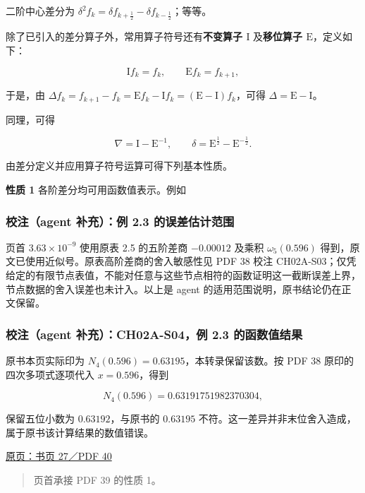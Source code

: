 \documentclass[
  10pt,
  fontset=fandol]{ctexart}
\begin{document}
二阶中心差分为 \(\delta^2 f_k=\delta f_{k+\frac12}-\delta f_{k-\frac12}\)；等等。

除了已引入的差分算子外，常用算子符号还有\textbf{不变算子 \(\mathrm{I}\)} 及\textbf{移位算子 \(\mathrm{E}\)}，定义如下：

\[
\mathrm{I}f_k=f_k,\qquad\mathrm{E}f_k=f_{k+1},
\]

于是，由 \(\Delta f_k=f_{k+1}-f_k=\mathrm{E}f_k-\mathrm{I}f_k=(\mathrm{E}-\mathrm{I})f_k\)，可得 \(\Delta=\mathrm{E}-\mathrm{I}\)。

同理，可得

\[
\nabla=\mathrm{I}-\mathrm{E}^{-1},\qquad
\delta=\mathrm{E}^{\frac12}-\mathrm{E}^{-\frac12}.
\]

由差分定义并应用算子符号运算可得下列基本性质。

\textbf{性质 1} 各阶差分均可用函数值表示。例如

\subsubsection{校注（agent 补充）：例 2.3 的误差估计范围}\label{ux6821ux6ce8agent-ux8865ux5145ux4f8b-2.3-ux7684ux8befux5deeux4f30ux8ba1ux8303ux56f4}

页首 \(3.63\times10^{-9}\) 使用原表 2.5 的五阶差商 \(-0.00012\) 及乘积 \(\omega_5(0.596)\) 得到，原文已使用近似号。原表高阶差商的舍入敏感性见 PDF 38 校注 CH02A-S03；仅凭给定的有限节点表值，不能对任意与这些节点相符的函数证明这一截断误差上界，节点数据的舍入误差也未计入。以上是 agent 的适用范围说明，原书结论仍在正文保留。

\subsubsection{校注（agent 补充）：CH02A-S04，例 2.3 的函数值结果}\label{ux6821ux6ce8agent-ux8865ux5145ch02a-s04ux4f8b-2.3-ux7684ux51fdux6570ux503cux7ed3ux679c}

原书本页实际印为 \(N_4(0.596)=0.63195\)，本转录保留该数。按 PDF 38 原印的四次多项式逐项代入 \(x=0.596\)，得到

\[
N_4(0.596)=0.63191751982370304,
\]

保留五位小数为 \(0.63192\)，与原书的 \(0.63195\) 不符。这一差异并非末位舍入造成，属于原书该计算结果的数值错误。

\href{../../source-images/pdf-040.jpeg}{原页：书页 27／PDF 40}

\begin{quote}
页首承接 PDF 39 的性质 1。
\end{quote}
\end{document}
